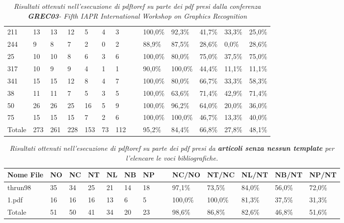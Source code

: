 \begin{table}
\begin{center}
\begin{tabular}{|l|l|l|l|l|l|l|l|l|l|l|l|l|}
211 & 13 & 13 & 12 & 5 & 4 & 3 & ~ & 100,0\% & 92,3\% & 41,7\% & 33,3\% & 25,0\%\\
244 & 9 & 8 & 7 & 2 & 0 & 2 & ~ & 88,9\% & 87,5\% & 28,6\% & 0,0\% & 28,6\%\\
25 & 10 & 10 & 8 & 6 & 3 & 6 & ~ & 100,0\% & 80,0\% & 75,0\% & 37,5\% & 75,0\%\\
317 & 10 & 9 & 9 & 4 & 1 & 1 & ~ & 90,0\% & 100,0\% & 44,4\% & 11,1\% & 11,1\%\\
341 & 15 & 15 & 12 & 8 & 4 & 7 & ~ & 100,0\% & 80,0\% & 66,7\% & 33,3\% & 58,3\%\\
38 & 11 & 11 & 7 & 5 & 3 & 5 & ~ & 100,0\% & 63,6\% & 71,4\% & 42,9\% & 71,4\%\\
50 & 26 & 26 & 25 & 16 & 5 & 9 & ~ & 100,0\% & 96,2\% & 64,0\% & 20,0\% & 36,0\%\\
75 & 15 & 15 & 15 & 7 & 2 & 6 & ~ & 100,0\% & 100,0\% & 46,7\% & 13,3\% & 40,0\%\\ \hline
Totale & 273 & 261 & 228 & 153 & 73 & 112 & ~ & 95,2\% & 84,4\% & 66,8\% & 27,8\% & 48,1\%\\ \hline
	\end{tabular}
	\tiny{\caption{\textit{Risultati ottenuti nell'esecuzione di pdftoref su parte dei pdf presi dalla conferenza \textbf{GREC03}- Fifth IAPR International Workshop on Graphics Recognition}}}
	\end{center}
	\end{table}
	

	\begin{table}\label{tab:articoli}
	\begin{center}
	\begin{tabular}{|l|l|l|l|l|l|l|l|l|l|l|l|l|} \hline
Nome File & NO & NC & NT & NL & NB & NP & ~ & NC/NO & NT/NC & NL/NT & NB/NT & NP/NT \\ \hline
thrun98 & 35 & 34 & 25 & 21 & 14 & 18 & ~ & 97,1\% & 73,5\% & 84,0\% & 56,0\% & 72,0\%\\
1.pdf & 16 & 16 & 16 & 13 & 6 & 5 & ~ & 100,0\% & 100,0\% & 81,3\% & 37,5\% & 31,3\%\\ \hline
Totale & 51 & 50 & 41 & 34 & 20 & 23 & ~ & 98,6\% & 86,8\% & 82,6\% & 46,8\% & 51,6\%\\ \hline
	\end{tabular}
	\tiny{\caption{\textit{Risultati ottenuti nell'esecuzione di pdftoref su parte dei pdf presi da \textbf{articoli senza nessun template} per l'elencare le voci bibliografiche.}}}
	\end{center}
	\end{table}
	

